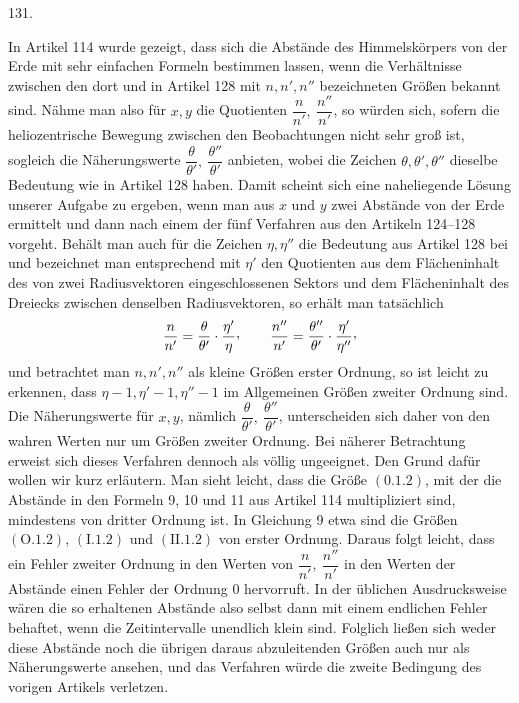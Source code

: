\par{}\medskip
\begin{center}\hypertarget{native-178-article131}{}131.\end{center}
In Artikel 114 wurde gezeigt, dass sich die Abstände des Himmelskörpers von der Erde mit sehr
einfachen Formeln bestimmen lassen, wenn die Verhältnisse zwischen den dort und in Artikel 128 mit
$n,n',n''$ bezeichneten Größen bekannt sind. Nähme man also für $x,y$ die Quotienten $\dfrac{n}{n'},\ \dfrac{n''}{n'}$, so würden sich,
sofern die heliozentrische Bewegung zwischen den Beobachtungen nicht sehr groß ist, sogleich die
Näherungswerte $\dfrac{\theta}{\theta'},\ \dfrac{\theta''}{\theta'}$ anbieten, wobei die Zeichen $\theta,\theta',\theta''$ dieselbe Bedeutung wie in Artikel 128 haben.
Damit scheint sich eine naheliegende Lösung unserer Aufgabe zu ergeben, wenn man aus $x$ und $y$
zwei Abstände von der Erde ermittelt und dann nach einem der fünf Verfahren aus den Artikeln 124–128
vorgeht. Behält man auch für die Zeichen $\eta,\eta''$ die Bedeutung aus Artikel 128 bei und bezeichnet man
entsprechend mit $\eta'$ den Quotienten aus dem Flächeninhalt des von zwei Radiusvektoren
eingeschlossenen Sektors und dem Flächeninhalt des Dreiecks zwischen denselben Radiusvektoren, so
erhält man tatsächlich
\[
\frac{n}{n'}=\frac{\theta}{\theta'}\cdot\frac{\eta'}{\eta}\mathpunct{\raisebox{.45ex}{,}}\qquad
\frac{n''}{n'}=\frac{\theta''}{\theta'}\cdot\frac{\eta'}{\eta''}\mathpunct{\raisebox{.45ex}{,}}
\]
und betrachtet man $n,n',n''$ als kleine Größen erster Ordnung, so ist leicht zu erkennen, dass $\eta-1,\eta'-1,\eta''-1$ im
Allgemeinen Größen zweiter Ordnung sind. Die Näherungswerte für $x,y$, nämlich $\dfrac{\theta}{\theta'},\ \dfrac{\theta''}{\theta'}$, unterscheiden
sich daher von den wahren Werten nur um Größen zweiter Ordnung. Bei näherer Betrachtung erweist sich
dieses Verfahren dennoch als völlig ungeeignet. Den Grund dafür wollen wir kurz erläutern. Man sieht
leicht, dass die Größe $(0.1.2)$, mit der die Abstände in den Formeln 9, 10 und 11 aus Artikel 114
multipliziert sind, mindestens von dritter Ordnung ist. In Gleichung 9 etwa sind die Größen $(\mathrm{O}.1.2)$,
$(\mathrm{I}.1.2)$ und $(\mathrm{II}.1.2)$ von erster Ordnung. Daraus folgt leicht, dass ein Fehler zweiter Ordnung in den Werten
von $\dfrac{n}{n'},\ \dfrac{n''}{n'}$ in den Werten der Abstände einen Fehler der Ordnung $0$ hervorruft. In der üblichen
Ausdrucksweise wären die so erhaltenen Abstände also selbst dann mit einem endlichen Fehler
behaftet, wenn die Zeitintervalle unendlich klein sind. Folglich ließen sich weder diese Abstände
noch die übrigen daraus abzuleitenden Größen auch nur als Näherungswerte ansehen, und das Verfahren
würde die zweite Bedingung des vorigen Artikels verletzen.
